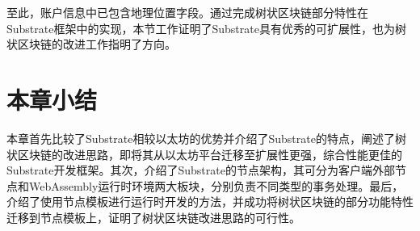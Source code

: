 至此，账户信息中已包含地理位置字段。通过完成树状区块链部分特性在Substrate框架中的实现，本节工作证明了Substrate具有优秀的可扩展性，也为树状区块链的改进工作指明了方向。

\section{本章小结}

本章首先比较了Substrate相较以太坊的优势并介绍了Substrate的特点，阐述了树状区块链的改进思路，即将其从以太坊平台迁移至扩展性更强，综合性能更佳的Substrate开发框架。其次，介绍了Substrate的节点架构，其可分为客户端外部节点和WebAssembly运行时环境两大板块，分别负责不同类型的事务处理。最后，介绍了使用节点模板进行运行时开发的方法，并成功将树状区块链的部分功能特性迁移到节点模板上，证明了树状区块链改进思路的可行性。
